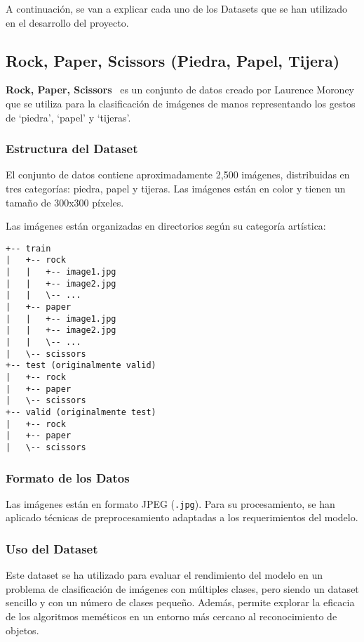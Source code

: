 A continuación, se van a explicar cada uno de los Datasets que se han utilizado en el desarrollo del proyecto.

\subsection{Rock, Paper, Scissors (Piedra, Papel, Tijera)}\label{subsec:rock-paper-scissors}
\textbf{Rock, Paper, Scissors}~\cite{noauthor_rock_nodate} es un conjunto de datos creado por Laurence Moroney
que se utiliza para la clasificación de imágenes de manos representando los gestos de `piedra', `papel' y `tijeras'.

\subsubsection{Estructura del Dataset}
El conjunto de datos contiene aproximadamente 2,500 imágenes, distribuidas en tres categorías: piedra, papel y tijeras.
Las imágenes están en color y tienen un tamaño de 300x300 píxeles.

Las imágenes están organizadas en directorios según su categoría artística:
\begin{verbatim}
+-- train
|   +-- rock
|   |   +-- image1.jpg
|   |   +-- image2.jpg
|   |   \-- ...
|   +-- paper
|   |   +-- image1.jpg
|   |   +-- image2.jpg
|   |   \-- ...
|   \-- scissors
+-- test (originalmente valid)
|   +-- rock
|   +-- paper
|   \-- scissors
+-- valid (originalmente test)
|   +-- rock
|   +-- paper
|   \-- scissors
\end{verbatim}


\subsubsection{Formato de los Datos}
Las imágenes están en formato JPEG (\texttt{.jpg}). Para su procesamiento, se han aplicado técnicas de preprocesamiento
adaptadas a los requerimientos del modelo.

\subsubsection{Uso del Dataset}
Este dataset se ha utilizado para evaluar el rendimiento del modelo en un problema de clasificación de imágenes con
múltiples clases, pero siendo un dataset sencillo y con un número de clases pequeño.
Además, permite explorar la eficacia de los algoritmos meméticos en un entorno más cercano al reconocimiento de objetos.

